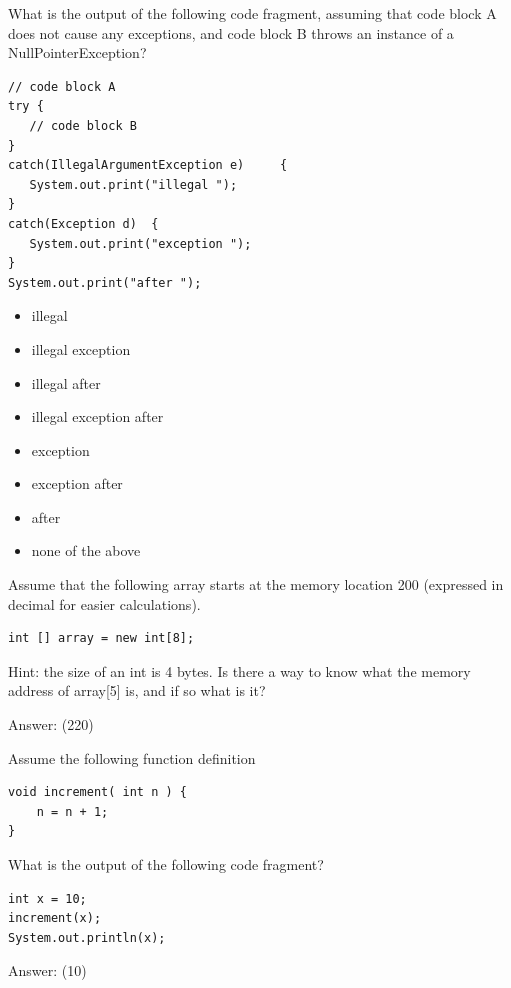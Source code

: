 \begin{question}
What is the output of the following code fragment, assuming that code block A does not cause any exceptions, and code block B throws an instance of a NullPointerException?

\begin{lstlisting}
// code block A
try {
   // code block B
}
catch(IllegalArgumentException e)     {
   System.out.print("illegal ");
}
catch(Exception d)  {
   System.out.print("exception ");
}
System.out.print("after ");
\end{lstlisting}

\begin{itemize}[leftmargin=2em,itemsep=1pt,topsep=2pt]
\item[\cb{0}] illegal
\item[\cb{0}] illegal exception
\item[\cb{0}] illegal after
\item[\cb{0}] illegal exception after
\item[\cb{0}] exception
\item[\cb{1}] exception after
\item[\cb{0}] after
\item[\cb{0}] none of the above
\end{itemize}
\end{question}

\begin{question}
Assume that the following array starts at the memory location 200 (expressed in decimal for easier calculations).

\begin{lstlisting}
int [] array = new int[8];
\end{lstlisting}

Hint: the size of an int is 4 bytes.
Is there a way to know what the memory address of array[5] is, and if so what is it?

Answer: \underline{\hspace{1in}} \ifanswers (220)\fi
\end{question}

\begin{question}
Assume the following function definition

\begin{lstlisting}
void increment( int n ) {
    n = n + 1;
}
\end{lstlisting}

What is the output of the following code fragment?

\begin{lstlisting}
int x = 10;
increment(x);
System.out.println(x);
\end{lstlisting}

Answer: \underline{\hspace{1in}} \ifanswers (10)\fi
\end{question}

